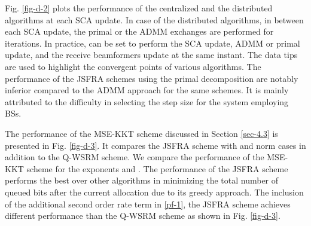 Fig. \ref{fig-d-2} plots the performance of the centralized and the distributed algorithms at each \ac{SCA} update. In case of the distributed algorithms, in between each \ac{SCA} update, the primal or the \ac{ADMM} exchanges are performed for  iterations. In practice,  can be set to perform the \ac{SCA} update, \ac{ADMM} or primal update, and the receive beamformers  update at the same instant. The data tips are used to highlight the convergent points of various algorithms. The performance of the \ac{JSFRA} schemes using the primal decomposition are notably inferior compared to the \ac{ADMM} approach for the same schemes. It is mainly attributed to the difficulty in selecting the step size for the system employing  \acp{BS}.

The performance of the \ac{MSE}-\ac{KKT} scheme discussed in Section \ref{sec-4.3} is presented in Fig. \ref{fig-d-3}. It compares the \ac{JSFRA} scheme with  and  norm cases in addition to the \ac{Q-WSRM} scheme. We compare the performance of the \ac{MSE}-\ac{KKT} scheme for the exponents  and . The performance of the  \ac{JSFRA} scheme performs the best over other algorithms in minimizing the total number of queued bits after the current allocation due to its greedy approach. The inclusion of the additional second order rate term in \eqref{pf-1}, the  \ac{JSFRA} scheme achieves different performance than the \ac{Q-WSRM} scheme as shown in Fig. \ref{fig-d-3}. 

